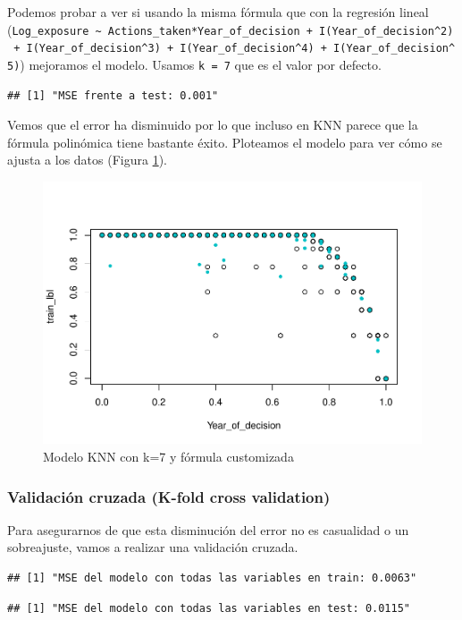 \documentclass[
]{article}
\begin{document}
Podemos probar a ver si usando la misma fórmula que con la regresión
lineal
(\texttt{Log\_exposure\ \textasciitilde{}\ Actions\_taken*Year\_of\_decision\ +\ I(Year\_of\_decision\^{}2)\ +\ I(Year\_of\_decision\^{}3)\ +\ I(Year\_of\_decision\^{}4)\ +\ I(Year\_of\_decision\^{}5)})
mejoramos el modelo. Usamos \texttt{k\ =\ 7} que es el valor por
defecto.

\begin{verbatim}
## [1] "MSE frente a test: 0.001"
\end{verbatim}

Vemos que el error ha disminuido por lo que incluso en KNN parece que la
fórmula polinómica tiene bastante éxito. Ploteamos el modelo para ver
cómo se ajusta a los datos (Figura \ref{fig:model_knn_2}).

\begin{figure}

{\centering \includegraphics[width=0.5\linewidth]{anacalt-regresion_files/figure-latex/model_knn_2-1} 

}

\caption{Modelo KNN con k=7 y fórmula customizada}\label{fig:model_knn_2}
\end{figure}

\hypertarget{validaciuxf3n-cruzada-k-fold-cross-validation-1}{%
\subsubsection{Validación cruzada (K-fold cross
validation)}\label{validaciuxf3n-cruzada-k-fold-cross-validation-1}}

Para asegurarnos de que esta disminución del error no es casualidad o un
sobreajuste, vamos a realizar una validación cruzada.

\begin{verbatim}
## [1] "MSE del modelo con todas las variables en train: 0.0063"
\end{verbatim}

\begin{verbatim}
## [1] "MSE del modelo con todas las variables en test: 0.0115"
\end{verbatim}
\end{document}

